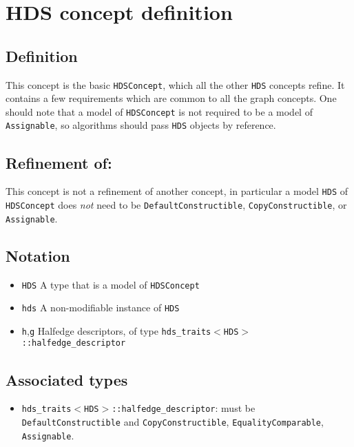 \section{HDS concept definition}\label{hdsconcept}
\subsection{Definition}\label{hdsconcept_refhdsconcept1}
This concept is the basic {\tt HDSConcept}, which all the other {\tt HDS} concepts refine. It contains a few requirements which are common to all the graph concepts. One should note that a model of {\tt HDSConcept} is not required to be a model of {\tt Assignable}, so algorithms should pass {\tt HDS} objects by reference.\subsection{Refinement of:}\label{hdsconcept_refhdsconcept2}
This concept is not a refinement of another concept, in particular a model {\tt HDS} of {\tt HDSConcept} does {\em not\/} need to be {\tt Default\-Constructible}, {\tt Copy\-Constructible}, or {\tt Assignable}.\subsection{Notation}\label{hdsconcept_refhdsconcept3}
\begin{itemize}
\item {\tt HDS} A type that is a model of {\tt HDSConcept}\item {\tt hds} A non-modifiable instance of {\tt HDS}\item {\tt h},{\tt g} Halfedge descriptors, of type {\tt hds\_\-traits$<$HDS$>$::halfedge\_\-descriptor}\end{itemize}
\subsection{Associated types}\label{hdsconcept_refhdsconcept4}
\begin{itemize}
\item {\tt hds\_\-traits$<$HDS$>$::halfedge\_\-descriptor}: must be {\tt Default\-Constructible} and {\tt Copy\-Constructible}, {\tt Equality\-Comparable}, {\tt Assignable}.\end{itemize}
